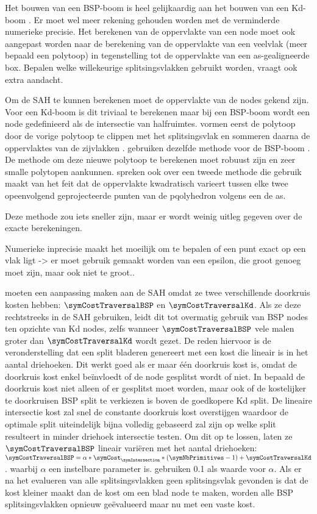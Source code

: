 Het bouwen van een BSP-boom is heel gelijkaardig aan het bouwen van een Kd-boom \cite{Ize}. 
Er moet wel meer rekening gehouden worden met de verminderde numerieke precisie. 
Het berekenen van de oppervlakte van een node moet ook aangepast worden naar de berekening van de oppervlakte van een veelvlak (meer bepaald een polytoop) in tegenstelling tot de oppervlakte van een as-gealigneerde box.
Bepalen welke willekeurige splitsingsvlakken gebruikt worden, vraagt ook extra aandacht.

Om de SAH te kunnen berekenen moet de oppervlakte van de nodes gekend zijn. 
Voor een Kd-boom is dit triviaal te berekenen maar bij een BSP-boom wordt een node gedefinieerd als de intersectie van halfruimtes.
\authorKammaje{ }vormen eerst de polytoop door de vorige polytoop te clippen met het splitsingsvlak en sommeren daarna de oppervlaktes van de zijvlakken \cite{Kammaje}.
\authorIze{ }gebruiken dezelfde methode voor de BSP-boom \cite{Ize}.
De methode om deze nieuwe polytoop te berekenen moet robuust zijn en zeer smalle polytopen aankunnen.
\authorKammaje{ }spreken ook over een tweede methode die gebruik maakt van het feit dat de oppervlakte kwadratisch varieert tussen elke twee opeenvolgend geprojecteerde punten van de pqolyhedron volgens een de as. 

Deze methode zou iets sneller zijn, maar er wordt weinig uitleg gegeven over de exacte berekeningen.

Numerieke inprecisie maakt het moeilijk om te bepalen of een punt exact op een vlak ligt -> er moet gebruik gemaakt worden van een epsilon, die groot genoeg moet zijn, maar ook niet te groot.\cite{Ize}.  

\authorIze{ }moeten een aanpassing maken aan de SAH omdat ze twee verschillende doorkruis kosten hebben: $\symCostTraversalBSP$ en $\symCostTraversalKd$.
Als ze deze rechtstreeks in de SAH gebruiken, leidt dit tot overmatig gebruik van BSP nodes ten opzichte van Kd nodes, zelfs wanneer $\symCostTraversalBSP$ vele malen groter dan $\symCostTraversalKd$ wordt gezet.
De reden hiervoor is de veronderstelling dat een split bladeren genereert met een kost die lineair is in het aantal driehoeken.
Dit werkt goed als er maar één doorkruis kost is, omdat de doorkruis kost enkel beïnvloedt of de node gesplitst wordt of niet.
In \cite{Ize} bepaald de doorkruis kost niet alleen of er gesplitst moet worden, maar ook of de kostelijker te doorkruisen BSP split te verkiezen is boven de goedkopere Kd split.
De lineaire intersectie kost zal snel de constante doorkruis kost overstijgen waardoor de optimale split uiteindelijk bijna volledig gebaseerd zal zijn op welke split resulteert in minder driehoek intersectie testen.
Om dit op te lossen, laten ze $\symCostTraversalBSP$ lineair variëren met het aantal driehoeken: $\symCostTraversalBSP = \alpha * \symCost_\symIntersection * (\symNbPrimitives - 1) + \symCostTraversalKd$. waarbij $\alpha$ een instelbare parameter is. \authorIze{ }gebruiken 0.1 als waarde voor $\alpha$.
Als er na het evalueren van alle splitsingsvlakken geen splitsingsvlak gevonden is dat de kost kleiner maakt dan de kost om een blad node te maken, worden alle BSP splitsingsvlakken opnieuw geëvalueerd maar nu met een vaste kost.

